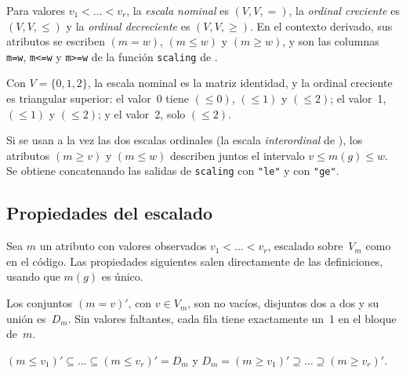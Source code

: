 \begin{definicion}\label{def:escalas}
Para valores $v_1 < \dots < v_r$, la \emph{escala nominal} es $(V, V, =)$, la \emph{ordinal creciente} es $(V, V, \le)$ y la \emph{ordinal decreciente} es $(V, V, \ge)$. En el contexto derivado, sus atributos se escriben $(m{=}w)$, $(m{\le}w)$ y $(m{\ge}w)$, y son las columnas \texttt{m=w}, \texttt{m<=w} y \texttt{m>=w} de la función \texttt{scaling} de .
\end{definicion}

\begin{ejemplo}\label{ej:escalas}
Con $V = \{0, 1, 2\}$, la escala nominal es la matriz identidad, y la ordinal creciente es triangular superior: el valor~0 tiene $(\le 0)$, $(\le 1)$ y $(\le 2)$; el valor~1, $(\le 1)$ y $(\le 2)$; y el valor~2, solo $(\le 2)$.
\end{ejemplo}

\begin{observacion}\label{obs:interordinal}
Si se usan a la vez las dos escalas ordinales (la escala \emph{interordinal} de \textcite{ganter1999}), los atributos $(m{\ge}v)$ y $(m{\le}w)$ describen juntos el intervalo $v \le m(g) \le w$. Se obtiene concatenando las salidas de \texttt{scaling} con \texttt{"le"} y con \texttt{"ge"}.
\end{observacion}


\subsection{Propiedades del escalado}
\label{sec:propiedades-escalado}

Sea $m$ un atributo con valores observados $v_1 < \dots < v_r$, escalado sobre~$V_m$ como en el código. Las propiedades siguientes salen directamente de las definiciones, usando que $m(g)$ es único.

\begin{proposicion}\label{prop:particion}
Los conjuntos $(m{=}v)'$, con $v \in V_m$, son no vacíos, disjuntos dos a dos y su unión es~$D_m$. Sin valores faltantes, cada fila tiene exactamente un~1 en el bloque de~$m$.
\end{proposicion}

\begin{proposicion}\label{prop:cadena}
$(m{\le}v_1)' \subseteq \dots \subseteq (m{\le}v_r)' = D_m$ y $D_m = (m{\ge}v_1)' \supseteq \dots \supseteq (m{\ge}v_r)'$.
\end{proposicion}

